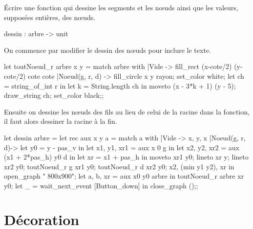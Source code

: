 \begin{question}{}{}
Écrire une fonction  qui dessine les segments et les nœuds ainsi que les valeurs, supposées entières, des nœuds.
\begin{ocaml}
dessin : arbre -> unit
\end{ocaml}

\reponse
On commence par modifier le dessin des nœuds pour inclure le texte.
\begin{ocaml}
let toutNoeud_r arbre x y =
    match arbre with
    |Vide ->  fill_rect (x-cote/2) (y-cote/2) cote cote
    |Noeud(g, r, d) ->  fill_circle x y rayon;
                        set_color white;
                        let ch = string_of_int r in
                        let k = String.length ch in
                        moveto (x - 3*k + 1) (y - 5);
                        draw_string ch;
                        set_color black;;
\end{ocaml}

Ensuite on dessine les nœuds des fils au lieu de celui de la racine dans la fonction, il faut alors dessiner la racine à la fin.

\begin{ocaml}
let dessin arbre =
    let rec aux x y a =
        match a with
        |Vide -> x, y, x
        |Noeud(g, r, d)-> 
                let y0 = y - pas_v in
                let x1, y1, xr1 = aux x 0 g in
                let x2, y2, xr2 = aux (x1 + 2*pas_h) y0 d in
                let xr = x1 + pas_h in
                moveto xr1 y0;
                lineto xr y;
                lineto xr2 y0;
                toutNoeud_r g xr1 y0;
                toutNoeud_r d xr2 y0;
                 x2, (min y1 y2), xr in
    open_graph " 800x900";
    let a, b, xr = aux x0 y0 arbre in toutNoeud_r arbre xr y0;
    let _ = wait_next_event [Button_down] in  close_graph ();;
\end{ocaml}
\end{question}
\newpage
\section{Décoration}
